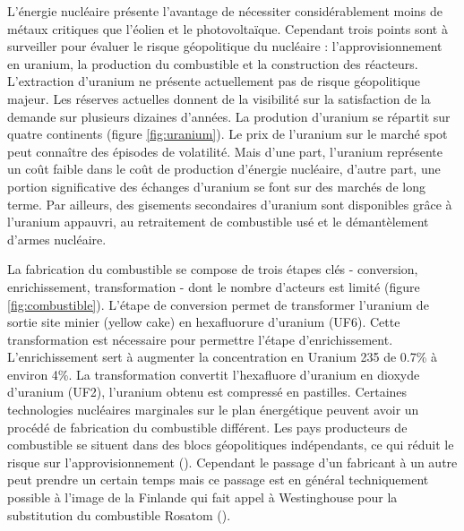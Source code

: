L'énergie nucléaire présente l'avantage de nécessiter considérablement moins de métaux critiques que l'éolien et le photovoltaïque. Cependant trois points sont à surveiller pour évaluer le risque géopolitique du nucléaire : l'approvisionnement en uranium, la production du combustible et la construction des réacteurs.\smallbreak
L'extraction d'uranium ne présente actuellement pas de risque géopolitique majeur. Les réserves actuelles donnent de la visibilité sur la satisfaction de la demande sur plusieurs dizaines d'années. La prodution d'uranium se répartit sur quatre continents (figure \ref{fig:uranium}).\smallbreak
Le prix de l'uranium sur le marché spot peut connaître des épisodes de volatilité. Mais d'une part, l'uranium représente un coût faible dans le coût de production d'énergie nucléaire, d'autre part, une portion significative des échanges d'uranium se font sur des marchés de long terme. Par ailleurs, des gisements secondaires d'uranium sont disponibles grâce à l'uranium appauvri, au retraitement de combustible usé et le démantèlement d'armes nucléaire.\smallbreak

La fabrication du combustible se compose de trois étapes clés - conversion, enrichissement, transformation - dont le nombre d'acteurs est limité (figure \ref{fig:combustible}).\smallbreak
L'étape de conversion permet de transformer l'uranium de sortie site minier (yellow cake) en hexafluorure d’uranium (UF6). Cette transformation est nécessaire pour permettre l'étape d'enrichissement. L'enrichissement sert à augmenter la concentration en Uranium 235 de 0.7\% à environ 4\%. La transformation convertit l'hexafluore d'uranium en dioxyde d'uranium (UF2), l'uranium obtenu est compressé en pastilles. Certaines technologies nucléaires marginales sur le plan énergétique peuvent avoir un procédé de fabrication du combustible différent. Les pays producteurs de combustible se situent dans des blocs géopolitiques indépendants, ce qui réduit le risque sur l'approvisionnement (\cite{meyer_les_2021}). Cependant le passage d'un fabricant à un autre peut prendre un certain temps mais ce passage est en général techniquement possible à l'image de la Finlande qui fait appel à Westinghouse pour la substitution du combustible Rosatom (\cite{westinghouse_electric_company_helping_2022}).\smallbreak

